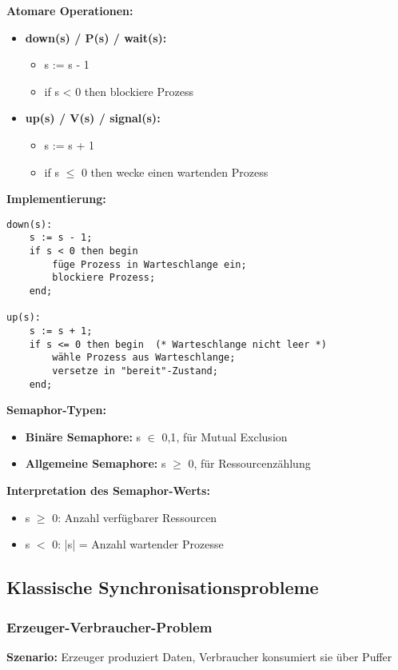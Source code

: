 \documentclass[9pt,a4paper]{extarticle}
\begin{document}
\begin{multicols*}{2}
\textbf{Atomare Operationen:}
\begin{itemize}
\item \textbf{down(s) / P(s) / wait(s):} 
  \begin{itemize}
  \item s := s - 1
  \item if s < 0 then blockiere Prozess
  \end{itemize}
\item \textbf{up(s) / V(s) / signal(s):}
  \begin{itemize}
  \item s := s + 1
  \item if s $\leq$ 0 then wecke einen wartenden Prozess
  \end{itemize}
\end{itemize}

\textbf{Implementierung:}
\begin{verbatim}
down(s):
    s := s - 1;
    if s < 0 then begin
        füge Prozess in Warteschlange ein;
        blockiere Prozess;
    end;

up(s):
    s := s + 1;
    if s <= 0 then begin  (* Warteschlange nicht leer *)
        wähle Prozess aus Warteschlange;
        versetze in "bereit"-Zustand;
    end;
\end{verbatim}

\textbf{Semaphor-Typen:}
\begin{itemize}
\item \textbf{Binäre Semaphore:} s $\in$ {0,1}, für Mutual Exclusion
\item \textbf{Allgemeine Semaphore:} s $\geq$ 0, für Ressourcenzählung
\end{itemize}

\textbf{Interpretation des Semaphor-Werts:}
\begin{itemize}
\item s $\geq$ 0: Anzahl verfügbarer Ressourcen
\item s $<$ 0: |s| = Anzahl wartender Prozesse
\end{itemize}

\subsection{Klassische Synchronisationsprobleme}

\subsubsection{Erzeuger-Verbraucher-Problem}
\textbf{Szenario:} Erzeuger produziert Daten, Verbraucher konsumiert sie über Puffer


\end{multicols*}
\end{document}
